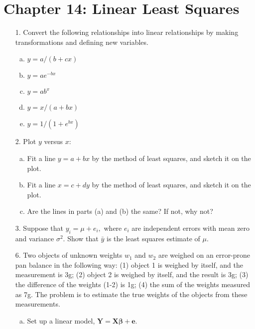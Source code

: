\documentclass{article}
\begin{document}
\section*{Chapter 14: Linear Least Squares}

\begin{itemize}
	\item[1.] Convert the following relationships into linear relationships by making transformations and defining new variables.
		\begin{enumerate}[a.]
			\item $y=a/(b+cx)$

			\item $y=ae^{-bx}$

			\item $y=ab^x$

			\item $y=x/(a+bx)$

			\item $y=1/(1+e^{bx})$
				
		\end{enumerate}

	\item[2.] Plot $y$ versus $x:$
		\begin{enumerate}[a.]
			\item Fit a line $y=a+bx$ by the method of least squares, and sketch it on the plot.

			\item Fit a line $x=c+dy$ by the method of least squares, and sketch it on the plot.

			\item Are the lines in parts (a) and (b) the same? If not, why not?

		\end{enumerate}

	\item[3.] Suppose that $y_i=\mu+e_i,$ where $e_i$ are independent errors with mean zero and variance $\sigma^2.$ Show that $\bar y$ is the least squares estimate of $\mu.$

	\item[6.] Two objects of unknown weights $w_1$ and $w_2$ are weighed on an error-prone pan balance in the following way: (1) object 1 is weighed by itself, and the measurement is 3g; (2) object 2 is weighed by itself, and the result is 3g; (3) the difference of the weights (1-2) is 1g; (4) the sum of the weights measured as 7g. The problem is to estimate the true weights of the objects from these measurements.
		\begin{enumerate}[a.]
			\item Set up a linear model, $\mathbf{Y}=\mathbf{X}\mathbf{\beta}+\mathbf{e}.$


\end{enumerate}
\end{itemize}
\end{document}
